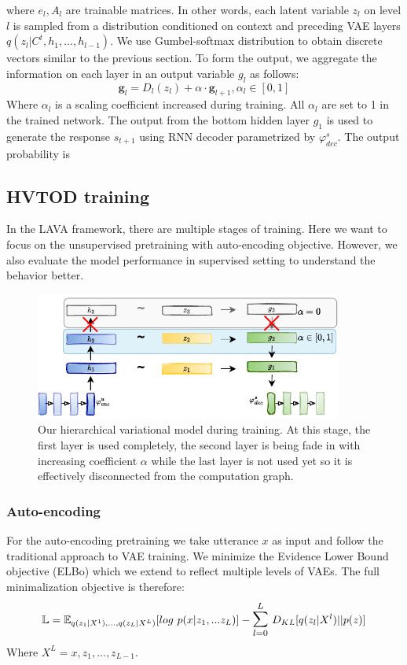 where $e_l, A_l$ are trainable matrices.
In other words, each latent variable $z_l$ on level $l$ is sampled from a  distribution conditioned on context and preceding VAE layers $q(z_l|C^t,h_1,...,h_{l-1})$.
We use Gumbel-softmax distribution to obtain discrete vectors similar to the previous section.
To form the output, we aggregate the information on each layer in an output variable $g_l$ as follows:
\begin{equation}
\mathbf{g}_l = D_l(z_l) + \alpha \cdot \mathbf{g}_{l+1}, \alpha_l \in [0, 1]
\end{equation}
Where $\alpha_l$ is a scaling coefficient increased during training. All $\alpha_l$ are set to 1 in the trained network.
The output from the bottom hidden layer $g_1$ is used to generate the response $s_{t+1}$  using RNN decoder parametrized by $\varphi^s_{dec}$.
The output probability is 
\subsection{HVTOD training}
In the LAVA framework, there are multiple stages of training.
Here we want to focus on the unsupervised pretraining with auto-encoding objective.
However, we also evaluate the model performance in supervised setting to understand the behavior better.
\begin{figure}[h]
    \centering
    \includegraphics[width=0.9\textwidth]{images/HVTOD-fadein-noN.pdf}
    \caption{Our hierarchical variational model during training. At this stage, the first layer is used completely, the second layer is being fade in with increasing coefficient $\alpha$ while the last layer is not used yet so it is effectively disconnected from the computation graph.}
    \label{05:fig:HVTOD-fadein}
\end{figure}
\subsubsection{Auto-encoding}
For the auto-encoding pretraining we take utterance $x$ as input and follow the traditional approach to VAE training.
We minimize the Evidence Lower Bound objective (ELBo) which we extend to reflect multiple levels of VAEs.
The full minimalization objective is therefore:
\begin{equation}
    \mathbb{L} = \mathbb{E}_{q(z_1|X^1),...,q(z_L|X^L)}[log~p(x|z_1,...z_L)] - \mathlarger{\mathlarger{\sum}}_{l=0}^L~D_{KL}[q(z_l|X^l)||p(z)]
\end{equation}
Where $X^L = x,z_1,...,z_{L-1}$.

